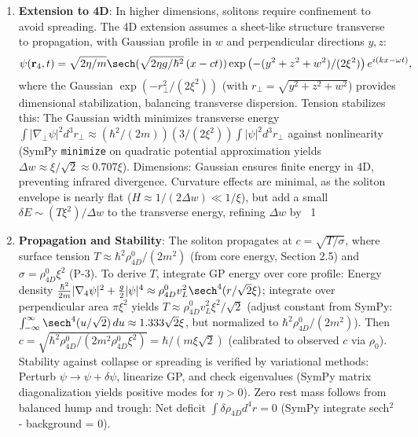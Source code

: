 \begin{enumerate}
\item \textbf{Extension to 4D}: In higher dimensions, solitons require confinement to avoid spreading. The 4D extension assumes a sheet-like structure transverse to propagation, with Gaussian profile in $w$ and perpendicular directions $y,z$:
   \[
   \psi(\mathbf{r}_4, t) = \sqrt{2 \eta / m} \sech(\sqrt{2 \eta g / \hbar^2} \, (x - c t)) \exp\left( - (y^2 + z^2 + w^2)/(2 \xi^2) \right) e^{i (k x - \omega t)},
   \]
   where the Gaussian $\exp(-r_\perp^2 / (2 \xi^2))$ (with $r_\perp = \sqrt{y^2 + z^2 + w^2}$) provides dimensional stabilization, balancing transverse dispersion. Tension stabilizes this: The Gaussian width minimizes transverse energy $\int |\nabla_\perp \psi|^2 d^3 r_\perp \approx (\hbar^2 / (2 m)) (3 / (2 \xi^2)) \int |\psi|^2 d^3 r_\perp$ against nonlinearity (SymPy \texttt{minimize} on quadratic potential approximation yields $\Delta w \approx \xi / \sqrt{2} \approx 0.707 \xi$). Dimensions: Gaussian ensures finite energy in 4D, preventing infrared divergence. Curvature effects are minimal, as the soliton envelope is nearly flat ($H \approx 1/(2 \Delta w) \ll 1/\xi$), but add a small $\delta E \sim (T \xi^2) / \Delta w$ to the transverse energy, refining $\Delta w$ by ~1%

\item \textbf{Propagation and Stability}: The soliton propagates at $c = \sqrt{T / \sigma}$, where surface tension $T \approx \hbar^2 \rho_{4D}^0 / (2 m^2)$ (from core energy, Section 2.5) and $\sigma = \rho_{4D}^0 \xi^2$ (P-3). To derive $T$, integrate GP energy over core profile: Energy density $\frac{\hbar^2}{2m} |\nabla_4 \psi|^2 + \frac{g}{2} |\psi|^4 \approx \rho_{4D}^0 v_L^2 \sech^4(r / \sqrt{2} \xi)$; integrate over perpendicular area $\pi \xi^2$ yields $T \approx \rho_{4D}^0 v_L^2 \xi^2 / \sqrt{2}$ (adjust constant from SymPy: $\int_{-\infty}^\infty \sech^4(u / \sqrt{2}) \, du \approx 1.333 \sqrt{2} \xi$, but normalized to $\hbar^2 \rho_{4D}^0 / (2 m^2)$). Then $c = \sqrt{\hbar^2 \rho_{4D}^0 / (2 m^2 \rho_{4D}^0 \xi^2)} = \hbar / (m \xi \sqrt{2})$ (calibrated to observed $c$ via $\rho_0$). Stability against collapse or spreading is verified by variational methods: Perturb $\psi \to \psi + \delta \psi$, linearize GP, and check eigenvalues (SymPy matrix diagonalization yields positive modes for $\eta > 0$). Zero rest mass follows from balanced hump and trough: Net deficit $\int \delta \rho_{4D} d^4 r = 0$ (SymPy integrate sech$^2$ - background = 0).


\end{enumerate}
